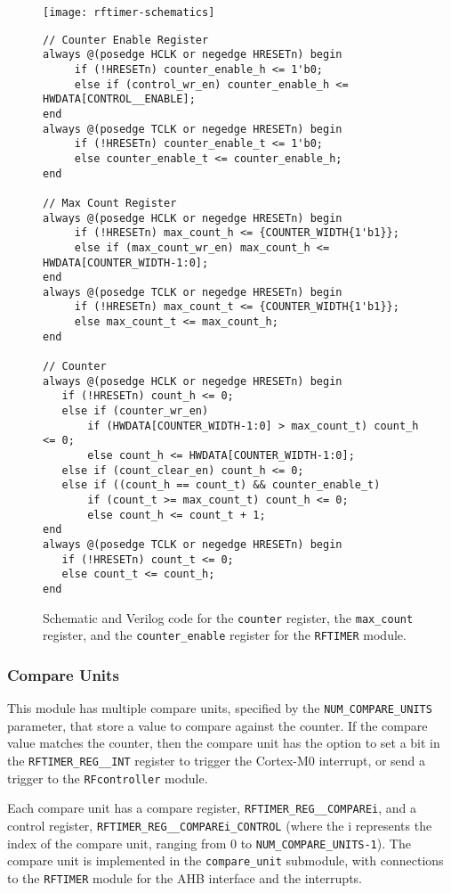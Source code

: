\begin{figure}
	\centering
	\texttt{[image: rftimer-schematics]}
	\begin{lstlisting}
// Counter Enable Register
always @(posedge HCLK or negedge HRESETn) begin
     if (!HRESETn) counter_enable_h <= 1'b0;
     else if (control_wr_en) counter_enable_h <= HWDATA[CONTROL__ENABLE];
end
always @(posedge TCLK or negedge HRESETn) begin
     if (!HRESETn) counter_enable_t <= 1'b0;
     else counter_enable_t <= counter_enable_h;
end
 
// Max Count Register
always @(posedge HCLK or negedge HRESETn) begin
     if (!HRESETn) max_count_h <= {COUNTER_WIDTH{1'b1}};
     else if (max_count_wr_en) max_count_h <= HWDATA[COUNTER_WIDTH-1:0];
end
always @(posedge TCLK or negedge HRESETn) begin
     if (!HRESETn) max_count_t <= {COUNTER_WIDTH{1'b1}};
     else max_count_t <= max_count_h;
end
 
// Counter
always @(posedge HCLK or negedge HRESETn) begin
   if (!HRESETn) count_h <= 0;
   else if (counter_wr_en)
       if (HWDATA[COUNTER_WIDTH-1:0] > max_count_t) count_h <= 0;
       else count_h <= HWDATA[COUNTER_WIDTH-1:0];
   else if (count_clear_en) count_h <= 0;
   else if ((count_h == count_t) && counter_enable_t)
       if (count_t >= max_count_t) count_h <= 0;
       else count_h <= count_t + 1;
end
always @(posedge TCLK or negedge HRESETn) begin
   if (!HRESETn) count_t <= 0;
   else count_t <= count_h;
end
	\end{lstlisting}
	\caption{Schematic and Verilog code for the \texttt{counter} register, the \texttt{max\_count} register, and the \texttt{counter\_enable} register for the \texttt{RFTIMER} module.}
	\label{fig:rftimer-coutner}
\end{figure}

\subsubsection{Compare Units}
This module has multiple compare units, specified by the \texttt{NUM\_COMPARE\_UNITS} parameter, that store a value to compare against the counter. If the compare value matches the counter, then the compare unit has the option to set a bit in the \texttt{RFTIMER\_REG\_\_INT} register to trigger the Cortex-M0 interrupt, or send a trigger to the \texttt{RFcontroller} module.

Each compare unit has a compare register, \texttt{RFTIMER\_REG\_\_COMPAREi}, and a control register, \texttt{RFTIMER\_REG\_\_COMPAREi\_CONTROL} (where the i represents the index of the compare unit, ranging from 0 to \texttt{NUM\_COMPARE\_UNITS-1}). The compare unit is implemented in the \texttt{compare\_unit} submodule, with connections to the \texttt{RFTIMER} module for the AHB interface and the interrupts.

